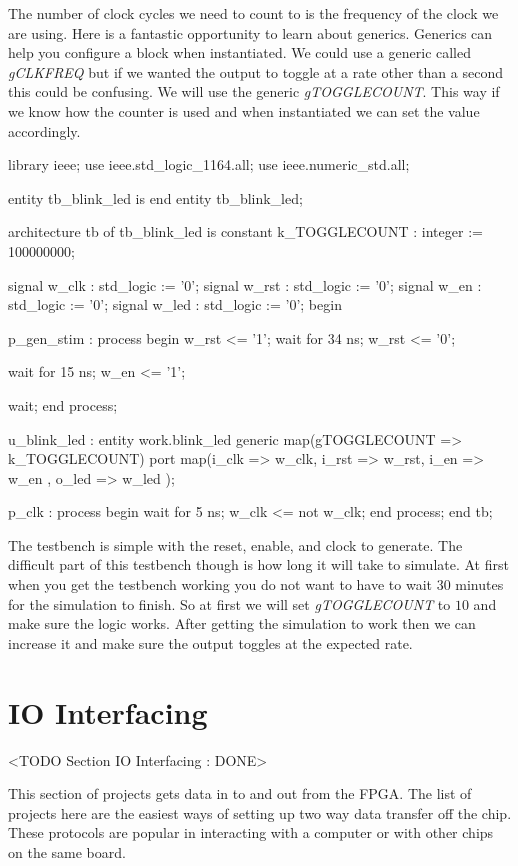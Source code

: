 The number of clock cycles we need to count to is the frequency of the clock we are using. Here is a fantastic opportunity to learn about generics. Generics can help you configure a block when instantiated. We could use a generic called \emph{gCLKFREQ} but if we wanted the output to toggle at a rate other than a second this could be confusing. We will use the generic \emph{gTOGGLECOUNT}. This way if we know how the counter is used and when instantiated we can set the value accordingly.
	
\begin{VHDLlisting}[tabsize=8]
library ieee;
  use ieee.std_logic_1164.all;
  use ieee.numeric_std.all;
  
entity tb_blink_led is
end entity tb_blink_led;

architecture tb of tb_blink_led is
	constant k_TOGGLECOUNT : integer := 100000000;

	signal w_clk : std_logic := '0';
	signal w_rst : std_logic := '0';
	signal w_en  : std_logic := '0';
	signal w_led : std_logic := '0';
begin

	p_gen_stim : process
	begin
		w_rst <= '1';
		wait for 34 ns;
		w_rst <= '0';
		
		wait for 15 ns;
		w_en <= '1';
		
		wait;
	end process;

	u_blink_led : entity work.blink_led
	generic map(gTOGGLECOUNT => k_TOGGLECOUNT)
	port map(i_clk   => w_clk,
		     i_rst   => w_rst,
		     i_en    => w_en ,
		     o_led   => w_led
	);

	p_clk : process
	begin
		wait for 5 ns;
		w_clk <= not w_clk;
	end process;	
end tb;
\end{VHDLlisting}

The testbench is simple with the reset, enable, and clock to generate. The difficult part of this testbench though is how long it will take to simulate. At first when you get the testbench working you do not want to have to wait $30$ minutes for the simulation to finish. So at first we will set \emph{gTOGGLECOUNT} to $10$ and make sure the logic works. After getting the simulation to work then we can increase it and make sure the output toggles at the expected rate. 

\section{IO Interfacing}
	<TODO Section IO Interfacing : DONE>
	
This section of projects gets data in to and out from the \ac{FPGA}. The list of projects here are the easiest ways of setting up two way data transfer off the chip. These protocols are popular in interacting with a computer or with other chips on the same board.

